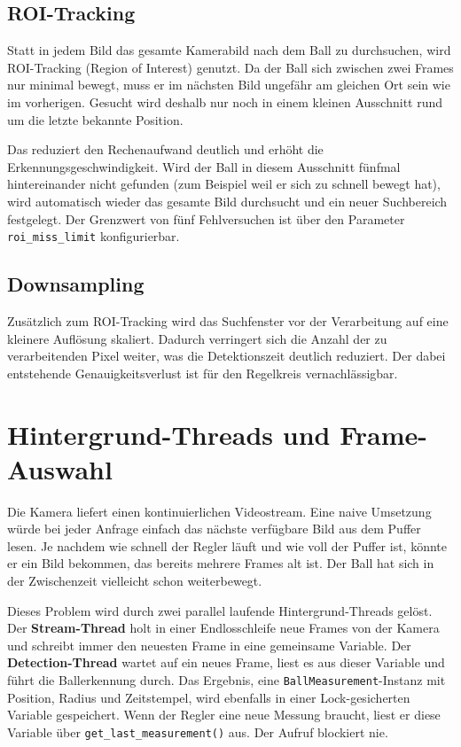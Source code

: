 \documentclass[11pt, a4paper]{scrreprt}
\begin{document}
\subsection{ROI-Tracking}

Statt in jedem Bild das gesamte Kamerabild nach dem Ball zu durchsuchen,
wird ROI-Tracking (Region of Interest) genutzt. Da der Ball sich zwischen
zwei Frames nur minimal bewegt, muss er im nächsten Bild ungefähr am gleichen
Ort sein wie im vorherigen. Gesucht wird deshalb nur noch in einem kleinen
Ausschnitt rund um die letzte bekannte Position.

Das reduziert den Rechenaufwand deutlich und erhöht die Erkennungsgeschwindigkeit.
Wird der Ball in diesem Ausschnitt fünfmal hintereinander nicht gefunden
(zum Beispiel weil er sich zu schnell bewegt hat), wird automatisch wieder
das gesamte Bild durchsucht und ein neuer Suchbereich festgelegt.
Der Grenzwert von fünf Fehlversuchen ist über den Parameter
\texttt{roi\_miss\_limit} konfigurierbar.

\subsection{Downsampling}

Zusätzlich zum ROI-Tracking wird das Suchfenster vor der Verarbeitung
auf eine kleinere Auflösung skaliert. Dadurch verringert sich die Anzahl der
zu verarbeitenden Pixel weiter, was die Detektionszeit deutlich reduziert.
Der dabei entstehende Genauigkeitsverlust ist für den Regelkreis vernachlässigbar.

\section{Hintergrund-Threads und Frame-Auswahl}
\label{sec:videostream}

Die Kamera liefert einen kontinuierlichen Videostream. Eine naive Umsetzung
würde bei jeder Anfrage einfach das nächste verfügbare Bild aus dem Puffer
lesen. Je nachdem wie schnell der Regler läuft und wie
voll der Puffer ist, könnte er ein Bild bekommen, das bereits mehrere
Frames alt ist. Der Ball hat sich in der Zwischenzeit vielleicht schon weiterbewegt.

Dieses Problem wird durch zwei parallel laufende Hintergrund-Threads gelöst.
Der \textbf{Stream-Thread} holt in einer Endlosschleife neue Frames von der
Kamera und schreibt immer den neuesten Frame in eine gemeinsame Variable.
Der \textbf{Detection-Thread} wartet auf ein neues Frame, liest es aus dieser
Variable und führt die Ballerkennung durch. Das Ergebnis, eine
\texttt{BallMeasurement}-Instanz mit Position, Radius und Zeitstempel,
wird ebenfalls in einer Lock-gesicherten Variable gespeichert.
Wenn der Regler eine neue Messung braucht, liest er diese Variable
über \texttt{get\_last\_measurement()} aus. Der Aufruf blockiert nie.
\end{document}
